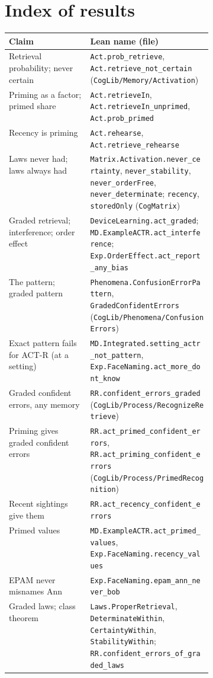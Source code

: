 \documentclass[11pt]{article}
\newcommand{\code}[1]{\texttt{#1}}
\newcommand{\lean}[1]{\texttt{#1}}
\begin{document}
\appendix
\section{Index of results}
\label{app:index}

\begin{table}[h]
\centering\footnotesize
\begin{tabularx}{\linewidth}{@{}>{\raggedright\arraybackslash}p{0.4\linewidth}>{\raggedright\arraybackslash}X@{}}
\toprule
Claim & Lean name (file) \\
\midrule
Retrieval probability; never certain & \lean{Act.prob\_retrieve}, \lean{Act.retrieve\_not\_certain} (\code{CogLib/Memory/Activation}) \\
Priming as a factor; primed share & \lean{Act.retrieveIn}, \lean{Act.retrieveIn\_unprimed}, \lean{Act.prob\_primed} \\
Recency is priming & \lean{Act.rehearse}, \lean{Act.retrieve\_rehearse} \\
Laws never had; laws always had & \lean{Matrix.Activation.never\_certainty}, \lean{never\_stability}, \lean{never\_orderFree}, \lean{never\_determinate}; \lean{recency}, \lean{storedOnly} (\code{CogMatrix}) \\
Graded retrieval; interference; order effect & \lean{DeviceLearning.act\_graded}; \lean{MD.ExampleACTR.act\_interference}; \lean{Exp.OrderEffect.act\_report\_any\_bias} \\
The pattern; graded pattern & \lean{Phenomena.ConfusionErrorPattern}, \lean{GradedConfidentErrors} (\code{CogLib/Phenomena/ConfusionErrors}) \\
Exact pattern fails for ACT-R (at a setting) & \lean{MD.Integrated.setting\_actr\_not\_pattern}, \lean{Exp.FaceNaming.act\_more\_dont\_know} \\
Graded confident errors, any memory & \lean{RR.confident\_errors\_graded} (\code{CogLib/Process/RecognizeRetrieve}) \\
Priming gives graded confident errors & \lean{RR.act\_primed\_confident\_errors}, \lean{RR.act\_priming\_confident\_errors} (\code{CogLib/Process/PrimedRecognition}) \\
Recent sightings give them & \lean{RR.act\_recency\_confident\_errors} \\
Primed values & \lean{MD.ExampleACTR.act\_primed\_values}, \lean{Exp.FaceNaming.recency\_values} \\
EPAM never misnames Ann & \lean{Exp.FaceNaming.epam\_ann\_never\_bob} \\
Graded laws; class theorem & \lean{Laws.ProperRetrieval}, \lean{DeterminateWithin}, \lean{CertaintyWithin}, \lean{StabilityWithin}; \lean{RR.confident\_errors\_of\_graded\_laws} \\

\end{tabularx}
\end{table}
\end{document}
